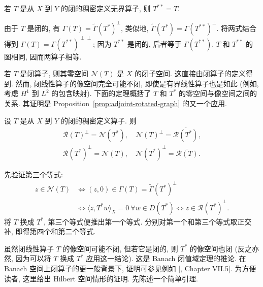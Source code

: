 
\begin{Proposition}\label{prop:double-adjoint-identity}
{若 $T$ 是从 $X$ 到 $Y$ 的闭的稠密定义无界算子, 则 $T^{**}=T$.}
\end{Proposition}

\begin{Proof}
{由于 $T$ 是闭的, 有 $\Gamma(T)=\widetilde\Gamma(T^*)^\perp$, 类似地, $\widetilde\Gamma(T^*)=\Gamma(T^{**})^\perp$. 将两式结合得到 $\Gamma(T)=\Gamma(T^{**})^{\perp\perp}$; 因为 $T^{**}$ 是闭的, 后者等于 $\Gamma(T^{**})$. $T$ 和 $T^{**}$ 的图相同, 因而两算子相等.}
\end{Proof}

{若 $T$ 是闭算子, 则其零空间 $\mathcal N(T)$ 是 $X$ 的闭子空间. 这直接由闭算子的定义得到. 然而, 闭线性算子的像空间完全可能不闭, 即使是有界线性算子也是如此 (例如, 考虑 $H^1$ 到 $L^2$ 的包含映射). 下面的定理概括了 $T$ 和 $T^*$ 的零空间与像空间之间的关系. 其证明是 Proposition~\ref{prop:adjoint-rotated-graph} 的又一个应用.}


\begin{Theorem}\label{thm:adjoint-kernel-range-orthogonality}
{设 $T$ 是从 $X$ 到 $Y$ 的闭的稠密定义算子. 则}
\[
\begin{gathered}
\mathcal R(T)^\perp=\mathcal N(T^*),\quad\mathcal N(T)^\perp=\overline{\mathcal R(T^*)},\\
\mathcal R(T^*)^\perp=\mathcal N(T),\quad\mathcal N(T^*)^\perp=\overline{\mathcal R(T)}.
\end{gathered}
\]
\end{Theorem}

\begin{Proof}
{先验证第三个等式:}
\[
\begin{aligned}
z\in\mathcal N(T)&\iff(z,0)\in\Gamma(T)=\widetilde\Gamma(T^*)^\perp\\
&\iff\langle z,T^*w\rangle_X=0\ \forall w\in D(T^*)\iff z\in\mathcal R(T^*)^\perp.
\end{aligned}
\]
{将 $T$ 换成 $T^*$, 第三个等式便推出第一个等式. 分别对第一个和第三个等式取正交补, 即得第四个和第二个等式.}
\end{Proof}

{虽然闭线性算子 $T$ 的像空间可能不闭, 但若它是闭的, 则 $T^*$ 的像空间也闭 (反之亦然, 因为可以将 $T$ 换成 $T^*$ 应用这一结论). 这是 Banach 闭值域定理的推论. 在 Banach 空间上闭算子的更一般背景下, 证明可参见例如 [, Chapter VII.5]. 为方便读者, 这里给出 Hilbert 空间情形的证明. 先陈述一个简单引理.}

